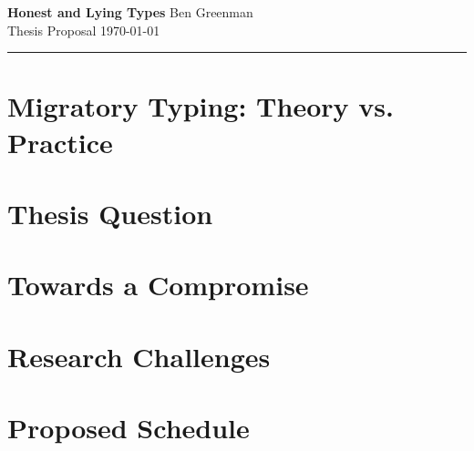 \documentclass[10pt]{article}
\renewcommand{\maketitle}{\noindent\textbf{Honest and Lying Types} \hfill Ben Greenman\\Thesis Proposal \hfill \today\\\hrule}
\begin{document}

\maketitle

\begin{abstract}

\end{abstract}

\newcommand{\mksec}[3]{\section{#3} \label{#1} }

\mksec{sec:history}{history}{Migratory Typing: Theory vs. Practice}
\mksec{sec:thesis}{thesis}{Thesis Question}
\mksec{sec:done}{done}{Towards a Compromise}
\mksec{sec:todo}{todo}{Research Challenges}
\mksec{sec:schedule}{schedule}{Proposed Schedule}

\footnotesize


\end{document}
